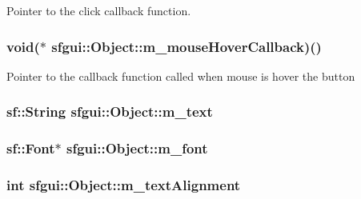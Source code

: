 Pointer to the click callback function. 

\hypertarget{classsfgui_1_1Object_ddff61a2d47a7b25e05aa5b6311417ea}{
\subsubsection[m\_\-mouseHoverCallback]{\setlength{\rightskip}{0pt plus 5cm}void($\ast$ {\bf sfgui::Object::m\_\-mouseHoverCallback})()}}
\label{classsfgui_1_1Object_ddff61a2d47a7b25e05aa5b6311417ea}


Pointer to the callback function called when mouse is hover the button \hypertarget{classsfgui_1_1Object_b63c033215c2f6f1d64645e3c6f0153b}{
\subsubsection[m\_\-text]{\setlength{\rightskip}{0pt plus 5cm}sf::String {\bf sfgui::Object::m\_\-text}}}
\label{classsfgui_1_1Object_b63c033215c2f6f1d64645e3c6f0153b}


\hypertarget{classsfgui_1_1Object_20ec4624e3d9b8e3cebeb71ec97fd104}{
\subsubsection[m\_\-font]{\setlength{\rightskip}{0pt plus 5cm}sf::Font$\ast$ {\bf sfgui::Object::m\_\-font}}}
\label{classsfgui_1_1Object_20ec4624e3d9b8e3cebeb71ec97fd104}


\hypertarget{classsfgui_1_1Object_7cfb56995f2140319df705fb1b146d36}{
\subsubsection[m\_\-textAlignment]{\setlength{\rightskip}{0pt plus 5cm}int {\bf sfgui::Object::m\_\-textAlignment}}}
\label{classsfgui_1_1Object_7cfb56995f2140319df705fb1b146d36}


